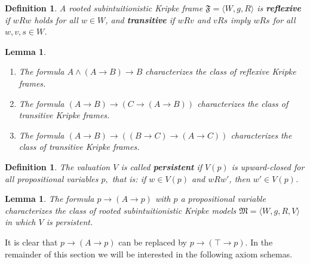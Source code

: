 \documentclass[12pt]{article}
\newtheorem{lem}[thm]{Lemma}
\newtheorem{dfn}[thm]{Definition}
\newcommand{\M}{\mbox{$\mathfrak{M}$}}
\begin{document}
\begin{dfn}
A rooted subintuitionistic Kripke frame $ \mathfrak{F}=\langle W, g, R \rangle  $ is \textbf{reflexive} if $ wRw $ holds for all $ w \in W$, and \textbf{transitive} if $ w Rv $ and $ vRs $ imply $ wRs $ for all $ w, v, s \in W $.
\end{dfn}

\begin{lem}\quad
\begin{enumerate}
\item[(a)]  The formula $A\wedge (A\rightarrow B)\rightarrow B $ characterizes the class of reflexive Kripke frames.
\item[(b)]   The formula $(A\rightarrow B)\rightarrow (C\rightarrow (A\rightarrow B) )$ characterizes the class of transitive Kripke frames.
\item[(c)]  The formula $(A\rightarrow B)\rightarrow ((B\rightarrow C)\rightarrow (A\rightarrow C) )$ characterizes the class of transitive
Kripke frames.
\end{enumerate}
\end{lem}

\begin{dfn}
The valuation $ V $ is called \textbf{persistent} if $  V(p) $ is upward-closed for all propositional variables
$ p, $
that is: if $w \in V(p)$ and $wRw'$, then $w'\in V(p)$.
\end{dfn}
\begin{lem}
\label{ch}
The formula $ p\rightarrow  (A\rightarrow p )$ with $ p $ a propositional variable characterizes the class of rooted subintuitionistic Kripke models $\M=\langle W, g, R, V\rangle $ in which $V$ is persistent.
\end{lem}
It is clear that $p\rightarrow  (A\rightarrow p ) $ can be replaced by $p\rightarrow  (\top\rightarrow p ) $. In the remainder of this section we will be interested in the following axiom schemas.
\end{document}
